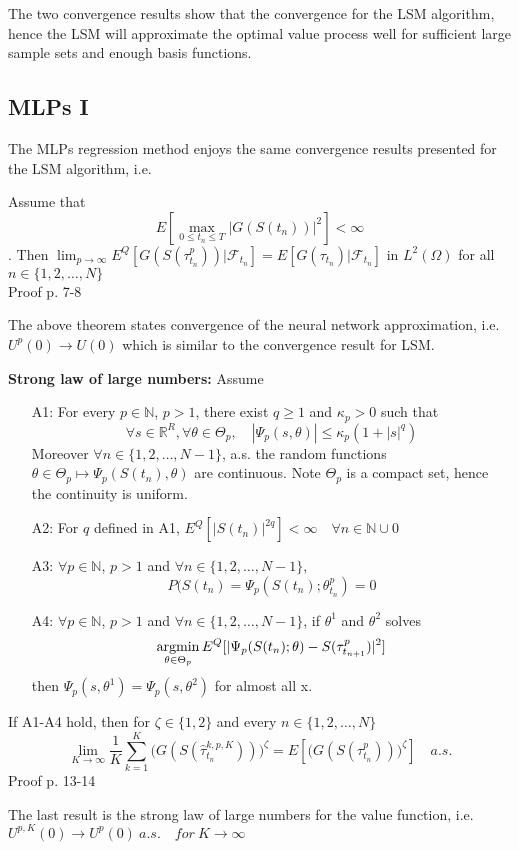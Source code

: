 The two convergence results show that the convergence for the LSM algorithm, hence the LSM will approximate the optimal value process well for sufficient large sample sets and enough basis functions.

\subsection{MLPs I}
The MLPs regression method enjoys the same convergence results presented for the LSM algorithm, i.e.
\begin{theorem}\label{NNConvergence1}
Assume that 
$$E[\max_{0\leq t_n \leq T} |G(S(t_n))|^2]< \infty$$. 
Then $\lim_{p \to \infty} E^Q[G(S(\tau^{p}_{t_n}))| \mathcal{F}_{t_n}]= E[G(\tau_{t_n})|\mathcal{F}_{t_n}]$ in $L^2(\Omega)$ for all $n \in \{1,2,\ldots, N\}$\\
Proof p. 7-8 \parencite{Lelong19}
\end{theorem}
The above theorem states convergence of the neural network approximation, i.e. $U^{p}(0) \to U(0)$ which is similar to the convergence result for LSM. 
\begin{theorem}{\textbf{Strong law of large numbers: }}\label{NNConvergence2}
Assume
\begin{enumerate}
\item[A1:] For every $p\in \mathbb{N}$, $p>1$, there exist $q \geq 1$ and $\kappa_p>0$ such that
$$\forall s \in \mathbb{R}^{R}, \forall \theta \in \Theta_p, \quad |\Psi_p(s,\theta)| \leq \kappa_p (1+|s|^q) $$
Moreover $\forall n \in \{1,2,\ldots, N-1\}$, a.s. the random functions $\theta \in \Theta_p \mapsto \Psi_p(S(t_n), \theta)$ are continuous. Note $\Theta_p$ is a compact set, hence the continuity is uniform.
\item[A2:] For $q$ defined in A1, $E^Q[|S(t_n)|^{2q}]<\infty \quad \forall n \in \mathbb{N} \cup 0$
\item[A3:] $\forall p \in \mathbb{N}$, $p>1$ and $\forall n \in \{1,2,\ldots, N-1\}$, 
$$P(S(t_n)=\Psi_{p}(S(t_n);\theta_{t_n}^{p})=0$$
\item[A4:] $\forall p \in \mathbb{N}$, $p>1$ and $\forall n \in \{1,2,\ldots, N-1\}$, if $\theta^{1}$ and $\theta^{2}$ solves 
\begin{align*}
\operatorname*{argmin}_{\theta \in \Theta_p} E^Q[|\Psi_p(S(t_n); \theta)- S(\tau_{t_{n+1}}^{p})|^2]
\end{align*}
then $\Psi_p(s,\theta^{1})=\Psi_p(s,\theta^{2})$ for almost all x.
\end{enumerate}
If A1-A4 hold, then for $\zeta\in \{1,2\}$ and every $n\in \{1,2,\ldots,N\}$
\begin{equation}
\lim_{K\to \infty} \dfrac{1}{K} \sum_{k=1}^{K} \bigg(G(S(\hat{\tau}_{t_n}^{k,p,K}))\bigg)^{\zeta} = E[\bigg(G(S(\tau_{t_n}^{p}))\bigg)^{\zeta}] \quad a.s.
\end{equation}
Proof p. 13-14 \parencite{Lelong19}
\end{theorem}
The last result is the strong law of large numbers for the value function, i.e. $U^{p,K}(0) \to U^{p}(0) \ a.s. \quad for \ K \to \infty$

